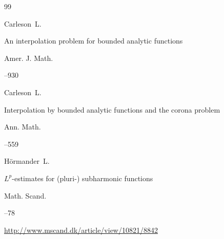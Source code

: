 \begin{thebibliography}{99}










\by Carleson~L.

\paper An interpolation problem for bounded analytic functions

\jour Amer. J. Math.




--930







\by Carleson~L.

\paper Interpolation by bounded analytic functions and the corona problem

\jour Ann. Math.




--559







\by H\"ormander~L.

\paper $L^p$-estimates for (pluri-) subharmonic functions

\jour Math. Scand.



--78

\elink \url{http://www.mscand.dk/article/view/10821/8842}


\end{thebibliography}
